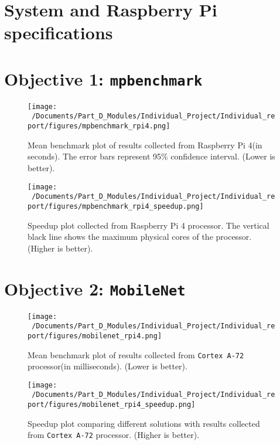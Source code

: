 \section{System and Raspberry Pi specifications}
\section{Objective 1: \texttt{mpbenchmark}}

\begin{figure}[H] %
	\centering
	\texttt{[image: ~/Documents/Part\_D\_Modules/Individual\_Project/Individual\_report/figures/mpbenchmark\_rpi4.png]} %
	\caption{Mean benchmark plot of results collected from Raspberry Pi 4(in seconds). The error bars represent 95\% confidence interval. (Lower is better).}
	\label{fig:mpbenchmark_rpi4_plot} %
\end{figure}

\begin{figure}[H] %
	\centering
	\texttt{[image: ~/Documents/Part\_D\_Modules/Individual\_Project/Individual\_report/figures/mpbenchmark\_rpi4\_speedup.png]} %
	\caption{Speedup plot collected from Raspberry Pi 4 processor. The vertical black line shows the maximum physical cores of the processor. (Higher is better).}
	\label{fig:mpbenchmark_rpi4_speedup_plot} %
\end{figure}

\section{Objective 2: \texttt{MobileNet}}

\begin{figure}[H] %
	\centering
	\texttt{[image: ~/Documents/Part\_D\_Modules/Individual\_Project/Individual\_report/figures/mobilenet\_rpi4.png]} %
	\caption{Mean benchmark plot of results collected from \texttt{Cortex A-72} processor(in milliseconds). (Lower is better).}
	\label{fig:mobilenet_rpi4_plot} %
\end{figure}

\begin{figure}[H] %
	\centering
	\texttt{[image: ~/Documents/Part\_D\_Modules/Individual\_Project/Individual\_report/figures/mobilenet\_rpi4\_speedup.png]} %
	\caption{Speedup plot comparing different solutions with results collected from \texttt{Cortex A-72} processor. (Higher is better).}
	\label{fig:mobilenet_rpi4_speedup} %
\end{figure}

